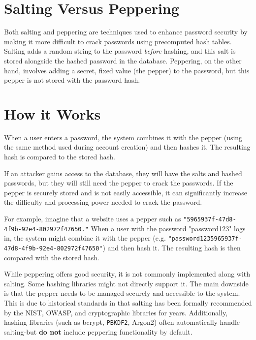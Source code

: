 \section{Salting Versus Peppering}
Both salting and peppering are techniques used to enhance password security by making it more difficult to crack passwords using precomputed hash tables. Salting adds a random string to the password \textit{before} hashing, and this salt is stored alongside the hashed password in the database. Peppering, on the other hand, involves adding a secret, fixed value (the pepper) to the password, but this pepper is not stored with the password hash.

\section{How it Works}
When a user enters a password, the system combines it with the pepper (using the same method used during account creation) and then hashes it. The resulting hash is compared to the stored hash.

If an attacker gains access to the database, they will have the salts and hashed passwords, but they will still need the pepper to crack the passwords. If the pepper is securely stored and is not easily accessible, it can significantly increase the difficulty and processing power needed to crack the password.

For example, imagine that a website uses a pepper such as \texttt{"5965937f-47d8-4f9b-92e4-802972f47650."} When a user with the password "password123" logs in, the system might combine it with the pepper (e.g. \texttt{"password1235965937f-47d8-4f9b-92e4-802972f47650"}) and then hash it. The resulting hash is then compared with the stored hash.

While peppering offers good security, it is not commonly implemented along with salting. Some hashing libraries might not directly support it. The main downside is that the pepper needs to be managed securely and accessible to the system. This is due to historical standards in that salting has been formally recommended by the NIST, OWASP, and cryptographic libraries for years. Additionally, hashing libraries (such as bcrypt, \texttt{PBKDF2}, Argon2) often automatically handle salting-but \textbf{do not} include peppering functionality by default.

